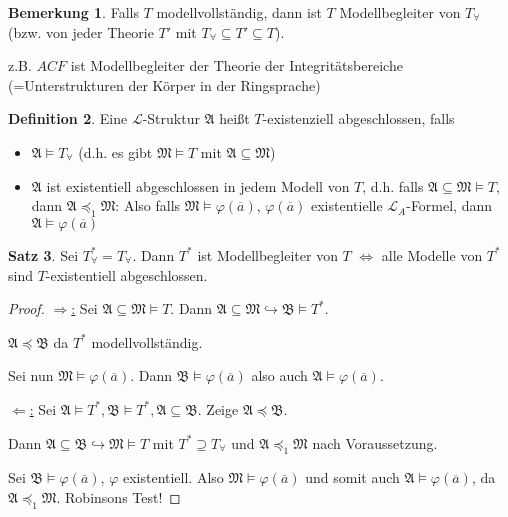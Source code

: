 \documentclass[12pt,parskip=full]{scrartcl}
\newcommand{\heading}{\underline}
\theoremstyle{definition}
\newtheorem{theorem}{Satz}[section]
\newtheorem{definition}[theorem]{Definition}
\newtheorem{remark}[theorem]{Bemerkung}
\begin{document}
	\begin{remark}
		Falls $T$ modellvollständig, dann ist $T$ Modellbegleiter von $T_\forall$ (bzw. von jeder Theorie $T'$ mit $T_\forall \subseteq T' \subseteq T$).
		
		z.B. $ACF$ ist Modellbegleiter der Theorie der Integritätsbereiche (=Unterstrukturen der Körper in der Ringsprache)
	\end{remark}

	\begin{definition}
		Eine $\mathcal{L}$-Struktur $\mathfrak{A}$ heißt $T$-existenziell abgeschlossen, falls
		\begin{itemize}
			\item $\mathfrak{A} \models T_\forall$ (d.h. es gibt $\mathfrak{M} \models T$ mit $\mathfrak{A} \subseteq \mathfrak{M}$)
			\item $\mathfrak{A}$ ist existentiell abgeschlossen in jedem Modell von $T$, d.h. falls $\mathfrak{A} \subseteq \mathfrak{M} \models T$, dann $\mathfrak{A} \preccurlyeq_1  \mathfrak{M}$: Also falls $\mathfrak{M} \models \varphi(\overline{a})$, $\varphi(\overline{a})$ existentielle $\mathcal{L}_A$-Formel, dann $\mathfrak{A} \models \varphi(\overline{a})$
		\end{itemize}
	\end{definition}

	\begin{theorem}
		Sei $T_\forall^* = T_\forall$. Dann $T^*$ ist Modellbegleiter von $T$ $\Leftrightarrow$ alle Modelle von $T^*$ sind $T$-existentiell abgeschlossen.
	\end{theorem}

	\begin{proof}
		\heading{$\Rightarrow$:} Sei $\mathfrak{A} \subseteq \mathfrak{M} \models T$. Dann $\mathfrak{A} \subseteq \mathfrak{M} \hookrightarrow \mathfrak{B} \models T^*$.
		
		$\mathfrak{A} \preccurlyeq \mathfrak{B}$ da $T^*$ modellvollständig.
		
		Sei nun $\mathfrak{M} \models \varphi(\overline{a})$. Dann $\mathfrak{B} \models \varphi(\overline{a})$ also auch $\mathfrak{A} \models \varphi(\overline{a})$.
		
		\heading{$\Leftarrow$:} Sei $\mathfrak{A} \models T^*, \mathfrak{B} \models T^*, \mathfrak{A} \subseteq \mathfrak{B}$. Zeige $\mathfrak{A} \preccurlyeq \mathfrak{B}$.
		
		Dann $\mathfrak{A} \subseteq \mathfrak{B} \hookrightarrow \mathfrak{M} \models T$ mit $T^* \supseteq T_\forall$ und $\mathfrak{A} \preccurlyeq_1 \mathfrak{M}$ nach Voraussetzung.
		
		Sei $\mathfrak{B} \models \varphi(\overline{a})$, $\varphi$ existentiell. Also $\mathfrak{M} \models \varphi(\overline{a})$ und somit auch $\mathfrak{A} \models \varphi(\overline{a})$, da $\mathfrak{A} \preccurlyeq_1 \mathfrak{M}$. Robinsons Test!
	\end{proof}
\end{document}
